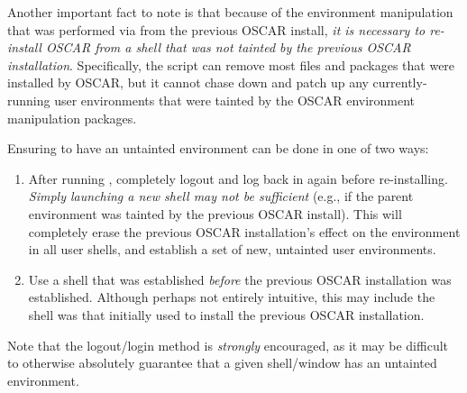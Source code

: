 Another important fact to note is that because of the environment
manipulation that was performed via  from the previous
OSCAR install, {\em it is necessary to re-install OSCAR from a shell
  that was not tainted by the previous OSCAR installation}.
Specifically, the  script can remove most files and
packages that were installed by OSCAR, but it cannot chase down and
patch up any currently-running user environments that were tainted by
the OSCAR environment manipulation packages.

Ensuring to have an untainted environment can be done in one of two
ways:

\begin{enumerate}
\item After running , completely logout and log back
  in again before re-installing.  {\em Simply launching a new shell
    may not be sufficient} (e.g., if the parent environment was
  tainted by the previous OSCAR install).  This will completely erase
  the previous OSCAR installation's effect on the environment in all
  user shells, and establish a set of new, untainted user
  environments.
  
\item Use a shell that was established {\em before} the previous OSCAR
  installation was established.  Although perhaps not entirely
  intuitive, this may include the shell was that initially used to
  install the previous OSCAR installation.
\end{enumerate}

Note that the logout/login method is {\em strongly} encouraged, as it
may be difficult to otherwise absolutely guarantee that a given
shell/window has an untainted environment.

